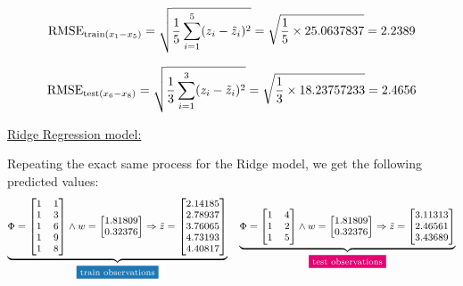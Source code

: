 \documentclass[12pt]{article}
\begin{document}
\begin{enumerate}
    \begin{equation*}
        \text{RMSE}_{\text{train}(x_1\--x_5)} = \sqrt{\frac{1}{5} \sum_{i=1}^{5} (z_{i} - \tilde{z}_{i})^2} = \sqrt{\frac{1}{5} \times 25.0637837} = 2.2389
    \end{equation*}

    \begin{equation*}
        \text{RMSE}_{\text{test}(x_6\--x_8)} = \sqrt{\frac{1}{3} \sum_{i=1}^{3} (z_{i} - \tilde{z}_{i})^2} = \sqrt{\frac{1}{3} \times 18.23757233} = 2.4656
    \end{equation*}
    
    \vspace{10pt}
    \underline{Ridge Regression model:}

    \vspace{10pt}
    Repeating the exact same process for the Ridge model, we get the following predicted values:
    \begin{equation*}
        \footnotesize
        \underbrace{
        \Phi = \begin{bmatrix}
            1 & 1 \\
            1 & 3 \\
            1 & 6 \\
            1 & 9 \\
            1 & 8 
        \end{bmatrix} \land w = \begin{bmatrix}
            1.81809 \\
            0.32376
        \end{bmatrix} \Rightarrow \tilde{z} = \begin{bmatrix}
            2.14185 \\
            2.78937 \\
            3.76065 \\
            4.73193 \\
            4.40817
        \end{bmatrix}
        }_{\text{\colorbox{codeblue}{\textcolor{white}{train observations}}}}
        \quad \underbrace{
            \Phi = \begin{bmatrix}
            1 & 4 \\
            1 & 2 \\
            1 & 5 
        \end{bmatrix} \land w = \begin{bmatrix}
            1.81809 \\
            0.32376
        \end{bmatrix} \Rightarrow \tilde{z} = \begin{bmatrix}
            3.11313 \\
            2.46561 \\
            3.43689
        \end{bmatrix}
        }_{\text{\colorbox{codepink}{\textcolor{white}{test observations}}}}
    \end{equation*}
    

\end{enumerate}
\end{document}
